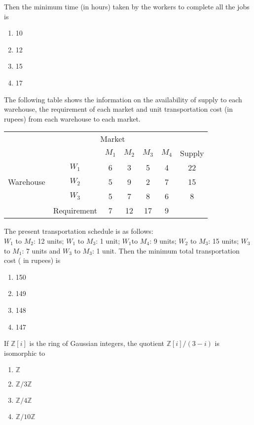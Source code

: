 Then the minimum time (in hours) taken by the workers to complete all the jobs is
\begin{enumerate}
    \item 10
    \item 12
    \item 15
    \item 17
\end{enumerate}
\item The following table shows the information on the availability of supply to each warehouse, the requirement of each market and unit transportation cost (in rupees) from each warehouse to each market.
\begin{table}[h!]
    \centering
    \begin{tabular}{c ccccc c}
        & \multicolumn{5}{c}{Market} & \\
        & & $M_1$ & $M_2$ & $M_3$ & $M_4$ & Supply \\
        & $W_1$ & 6 & 3 & 5 & 4 & 22 \\
        Warehouse & $W_2$ & 5 & 9 & 2 & 7 & 15 \\
        & $W_3$ & 5 & 7 & 8 & 6 & 8 \\
        & Requirement & 7 & 12 & 17 & 9 & \\ %
    \end{tabular}
\end{table}

The present transportation schedule is as follows: \\
$W_1$ to $M_2$: 12 units; $W_1$ to $M_3$: 1 unit; $W_1$to $M_4$: 9 units; $W_2$ to $M_3$: 15 units; $W_3$ to $M_1$: 7 units and $W_3$ to $M_3$: 1 unit. Then the minimum total transportation cost ( in rupees) is 
\begin{enumerate}
    \item 150
    \item 149
    \item 148
    \item 147
\end{enumerate}
\item If $\mathbb{Z}[i]$ is the ring of Gaussian integers, the quotient $\mathbb{Z}[i]/(3-i)$ is isomorphic to
\begin{enumerate}
    \item $\mathbb{Z}$
    \item $\mathbb{Z}/3\mathbb{Z}$
    \item $\mathbb{Z}/4\mathbb{Z}$
    \item $\mathbb{Z}/10\mathbb{Z}$
\end{enumerate}

